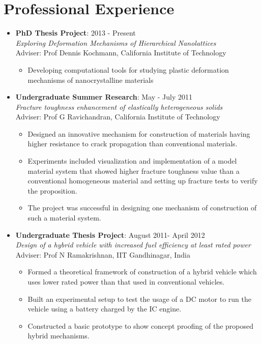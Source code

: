 \documentclass[10pt,fleqn]{article}
\begin{document}
\section*{Professional Experience}
\begin{itemize}

\item[] \textbf{PhD Thesis Project}: \hfill 2013 - Present\\
		\emph{Exploring Deformation Mechanisms of Hierarchical Nanolattices} \\
		 Adviser: Prof Dennis Kochmann, California Institute of Technology
		  \begin{itemize}
		  \item  Developing computational tools for studying plastic deformation mechanisms of nanocrystalline materials
 		  \end{itemize}
 		  
\item[] \textbf{Undergraduate Summer Research}: \hfill May - July 2011\\
		\emph{Fracture toughness enhancement of elastically heterogeneous solids} \\
		  Adviser: Prof G Ravichandran, California Institute of Technology
		   \begin{itemize}
			\item Designed an innovative mechanism for construction of materials having higher resistance to crack propagation than conventional materials.
			\item Experiments included visualization and implementation of a model material system that showed higher fracture toughness value than a conventional homogeneous material and setting up fracture tests to verify the proposition.
			\item The project was successful in designing one mechanism of construction of such a material system.
 			\end{itemize}
 			
\item[] \textbf{Undergraduate Thesis Project}: \hfill August 2011- April 2012\\
		\emph{Design of a hybrid vehicle with increased fuel efficiency at least rated power}\\
		  Adviser: Prof N Ramakrishnan, IIT Gandhinagar, India
		   \begin{itemize}
			\item Formed a theoretical framework of construction of a hybrid vehicle which uses lower rated power than that used in conventional vehicles.
			\item Built an experimental setup to test the usage of a DC motor to run the vehicle using a battery charged by the IC engine.
			\item Constructed a basic prototype to show concept proofing of the proposed hybrid mechanisms.
 			\end{itemize} 
 			

\end{itemize}
\end{document}
